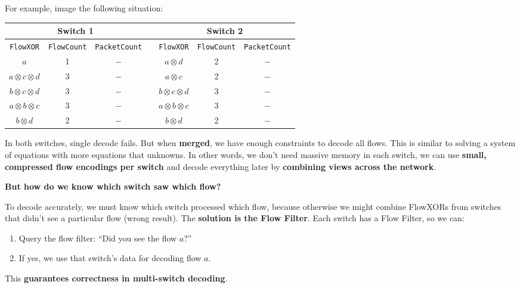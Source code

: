 \highspace
For example, image the following situation:
\begin{table}[!htp]
    \centering
    \begin{adjustbox}{width={\textwidth},totalheight={\textheight},keepaspectratio}
        \begin{tabular}{@{} c | c | c | c | c | c | c @{}}
            \toprule
            \multicolumn{3}{c|}{Switch 1} & & \multicolumn{3}{c}{Switch 2} \\
            \midrule
            \texttt{FlowXOR} & \texttt{FlowCount} & \texttt{PacketCount} & & \texttt{FlowXOR} & \texttt{FlowCount} & \texttt{PacketCount} \\
            \midrule
            $a$ & 1 & $-$ & & $a \otimes d$ & 2 & $-$ \\
            $a \otimes c \otimes d$ & 3 & $-$ & & $a \otimes c$ & 2 & $-$ \\
            $b \otimes c \otimes d$ & 3 & $-$ & & $b \otimes c \otimes d$ & 3 & $-$ \\
            $a \otimes b \otimes c$ & 3 & $-$ & & $a \otimes b \otimes c$ & 3 & $-$ \\
            $b \otimes d$ & 2 & $-$ & & $b \otimes d$ & 2 & $-$ \\
            \bottomrule
        \end{tabular}
    \end{adjustbox}
\end{table}

\noindent
In both switches, single decode fails. But when \textbf{merged}, we have enough constraints to decode all flows. This is similar to solving a system of equations with more equations that unknowns. In other words, we don't need massive memory in each switch, we can use \textbf{small, compressed flow encodings per switch} and decode everything later by \textbf{combining views across the network}.

\highspace
\begin{flushleft}
    \textcolor{Green3}{ \textbf{But how do we know which switch saw which flow?}}
\end{flushleft}
To decode accurately, we must know which switch processed which flow, because otherwise we might combine FlowXORs from switches that didn't see a particular flow (wrong result). The \textbf{solution is the Flow Filter}. Each switch has a Flow Filter, so we can:
\begin{enumerate}
    \item Query the flow filter: ``Did you see the flow $a$?''
    \item If yes, we use that switch's data for decoding flow $a$.
\end{enumerate}
This \textbf{guarantees correctness in multi-switch decoding}.

